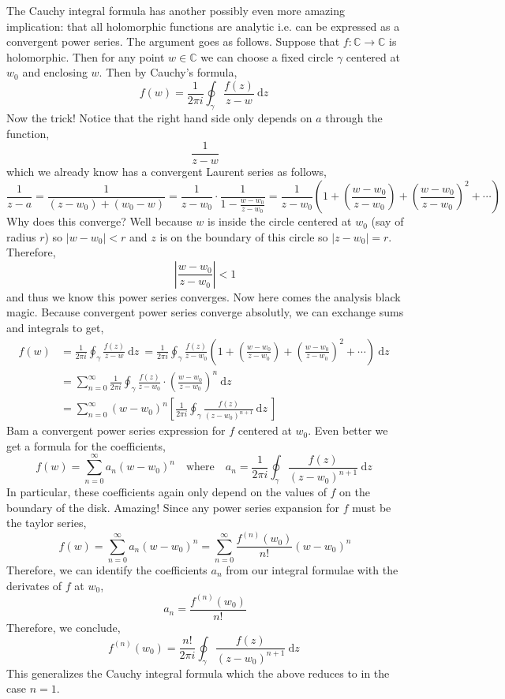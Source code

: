 \documentclass{article}
\newcommand{\C}{\mathbb{C}}
\renewcommand{\d}[1]{\: \mathrm{d}#1 \:}
\theoremstyle{definition}
\begin{document}
The Cauchy integral formula has another possibly even more amazing implication: that all holomorphic functions are analytic i.e. can be expressed as a convergent power series. The argument goes as follows. Suppose that $f : \C \to \C$ is holomorphic. Then for any point $w \in \C$ we can choose a fixed circle $\gamma$ centered at $w_0$ and enclosing $w$. Then by Cauchy's formula,
\[ f(w) = \frac{1}{2 \pi i} \oint_\gamma \frac{f(z)}{z - w} \d{z} \]
Now the trick! Notice that the right hand side only depends on $a$ through the function,
\[ \frac{1}{z - w}  \]
which we already know has a convergent Laurent series as follows,
\[ \frac{1}{z - a} = \frac{1}{(z - w_0) + (w_0 - w)} = \frac{1}{z - w_0} \cdot \frac{1}{1 - \frac{w - w_0}{z - w_0}} = \frac{1}{z - w_0} \left( 1 + \left( \frac{w - w_0}{z - w_0} \right) + \left( \frac{w - w_0}{z - w_0} \right)^2 + \cdots \right) \]
Why does this converge? Well because $w$ is inside the circle centered at $w_0$ (say of radius $r$) so $|w - w_0| < r$ and $z$ is on the boundary of this circle so $|z - w_0| = r$. Therefore,
\[ \left| \frac{w - w_0}{z - w_0} \right| < 1 \]
and thus we know this power series converges. Now here comes the analysis black magic. Because convergent power series converge absolutly, we can exchange sums and integrals to get,
\begin{align*}
f(w) & = \frac{1}{2 \pi i} \oint_\gamma \frac{f(z)}{z - w} \d{z} = \frac{1}{2 \pi i} \oint_{\gamma} \frac{f(z)}{z - w_0} \left( 1 + \left( \frac{w - w_0}{z - w_0} \right) + \left(\frac{w - w_0}{z - w_0} \right)^2 + \cdots \right)  \d{z} 
\\
& = \sum_{n = 0}^{\infty} \frac{1}{2 \pi i} \oint_{\gamma} \frac{f(z)}{z - w_0} \cdot \left( \frac{w - w_0}{z - w_0} \right)^{n} \d{z}
\\
& = \sum_{n = 0}^\infty (w - w_0)^n \left[ \frac{1}{2 \pi i} \oint_{\gamma} \frac{f(z)}{(z - w_0)^{n+1}} \d{z} \right] 
\end{align*}
Bam a convergent power series expression for $f$ centered at $w_0$. Even better we get a formula for the coefficients,
\[ f(w) = \sum_{n = 0}^\infty a_n (w - w_0)^n \quad \text{where} \quad a_n = \frac{1}{2 \pi i} \oint_{\gamma} \frac{f(z)}{(z - w_0)^{n+1}} \d{z} \]
In particular, these coefficients again only depend on the values of $f$ on the boundary of the disk. Amazing! 
Since any power series expansion for $f$ must be the taylor series,
\[ f(w) = \sum_{n = 0}^\infty a_n (w - w_0)^n = \sum_{n = 0}^\infty \frac{f^{(n)}(w_0)}{n!} (w - w_0)^n \]
Therefore, we can identify the coefficients $a_n$ from our integral formulae with the derivates of $f$ at $w_0$,
\[ a_n = \frac{f^{(n)}(w_0)}{n!} \]
Therefore, we conclude,
\[ f^{(n)}(w_0) = \frac{n!}{2 \pi i} \oint_\gamma \frac{f(z)}{(z - w_0)^{n+1}} \d{z} \]
This generalizes the Cauchy integral formula which the above reduces to in the case $n = 1$.
\end{document}
